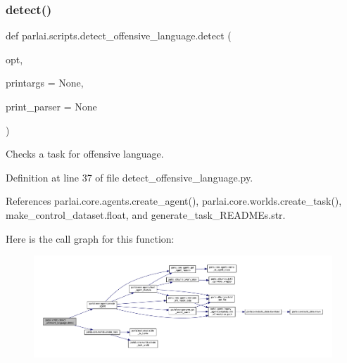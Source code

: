 \subsubsection{\texorpdfstring{detect()}{detect()}}
{\footnotesize\ttfamily def parlai.\+scripts.\+detect\+\_\+offensive\+\_\+language.\+detect (\begin{DoxyParamCaption}\item[{}]{opt,  }\item[{}]{printargs = {\ttfamily None},  }\item[{}]{print\+\_\+parser = {\ttfamily None} }\end{DoxyParamCaption})}

\begin{DoxyVerb}Checks a task for offensive language.
\end{DoxyVerb}
 

Definition at line 37 of file detect\+\_\+offensive\+\_\+language.\+py.



References parlai.\+core.\+agents.\+create\+\_\+agent(), parlai.\+core.\+worlds.\+create\+\_\+task(), make\+\_\+control\+\_\+dataset.\+float, and generate\+\_\+task\+\_\+\+R\+E\+A\+D\+M\+Es.\+str.

Here is the call graph for this function\+:
\nopagebreak
\begin{figure}[H]
\begin{center}
\leavevmode
\includegraphics[width=350pt]{namespaceparlai_1_1scripts_1_1detect__offensive__language_aecc66ec4441e506a93d25964889c185f_cgraph}
\end{center}
\end{figure}
\mbox{\label{namespaceparlai_1_1scripts_1_1detect__offensive__language_ab3f20447fd2442afdcd45dd77b619378}} 
